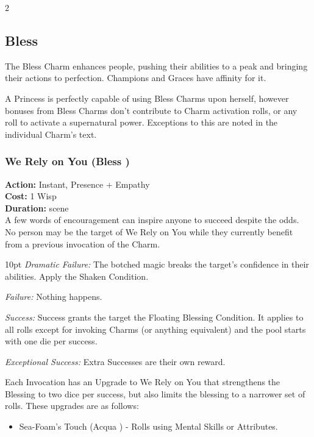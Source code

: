 \begin{multicols}{2}
\subsection*{Bless}
\label{subsec:Bless}
The Bless Charm enhances people, pushing their abilities to a peak and bringing their actions to perfection. Champions and Graces have affinity for it.

A Princess is perfectly capable of using Bless Charms upon herself, however bonuses from Bless Charms don't contribute to Charm activation rolls, or any roll to activate a supernatural power. Exceptions to this are noted in the individual Charm's text. 

\subsubsection*{We Rely on You (Bless \textbullet)}

\noindent \textbf{Action:} Instant, Presence + Empathy\\

\noindent \textbf{Cost:} 1 Wisp\\

\noindent \textbf{Duration:} scene \\

A few words of encouragement can inspire anyone to succeed despite the odds. No person may be the target of We Rely on You while they currently benefit from a previous invocation of the Charm.

\begin{myindentpar}{10pt}  \emph{Dramatic Failure:} The botched magic breaks the target's confidence in their abilities. Apply the Shaken Condition. 

        \emph{Failure:} Nothing happens. 

        \emph{Success:} Success grants the target the Floating Blessing Condition. It applies to all rolls except for invoking Charms (or anything equivalent) and the pool starts with one die per success. 

        \emph{Exceptional Success:} Extra Successes are their own reward.\end{myindentpar}
		
\noindent Each Invocation has an Upgrade to We Rely on You that strengthens the Blessing to two dice per success, but also limits the blessing to a narrower set of rolls. These upgrades are as follows: 

\begin{itemize}
\item    Sea-Foam's Touch (Acqua \textbullet) - Rolls using Mental Skills or Attributes.


\end{itemize}
\end{multicols}
